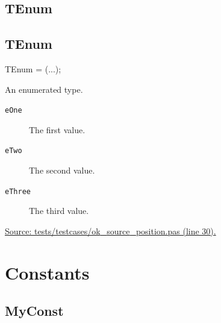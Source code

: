 \documentclass{report}
\newif\ifpdf
\begin{document}
\subsection*{\large{\textbf{TEnum}}\normalsize\hspace{1ex}\hrulefill}
\else
\subsection*{TEnum}
\fi
\label{ok_source_position-TEnum}
\begin{list}{}{
\setlength{\itemindent}{0cm}
\setlength{\listparindent}{0cm}
\setlength{\leftmargin}{\evensidemargin}
\addtolength{\leftmargin}{\tmplength}
\settowidth{\labelsep}{X}
\addtolength{\leftmargin}{\labelsep}
\setlength{\labelwidth}{\tmplength}
}
\item[\textbf{Declaration}\hfill]
\ifpdf
\begin{flushleft}
\fi
\begin{ttfamily}
TEnum = (...);\end{ttfamily}

\ifpdf
\end{flushleft}
\fi

\par
\item[\textbf{Description}]
An enumerated type.\item[\textbf{Values}]
\begin{description}
\item[\texttt{eOne}] \label{ok_source_position-eOne}
\index{}
The first value.
\item[\texttt{eTwo}] \label{ok_source_position-eTwo}
\index{}
The second value.
\item[\texttt{eThree}] \label{ok_source_position-eThree}
\index{}
The third value.
\end{description}
\par
\href{https://github.com/pasdoc/pasdoc/blob/master/tests/testcases/ok_source_position.pas#L30}{Source: tests/testcases/ok{\_}source{\_}position.pas (line 30).}

\end{list}
\section{Constants}
\ifpdf
\subsection*{\large{\textbf{MyConst}}\normalsize\hspace{1ex}\hrulefill}
\else
\end{document}
